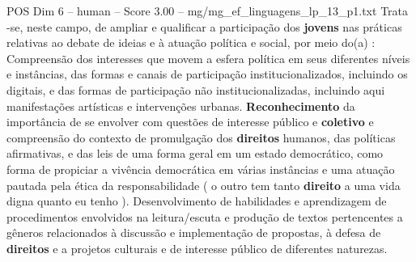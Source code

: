 \begin{textsample}{POS Dim 6 – human – Score 3.00 – mg/mg\_ef\_linguagens\_lp\_13\_p1.txt}  \label{ex:f6_pos_019}
Trata -se, neste campo, de ampliar e qualificar a participação dos \textbf{jovens} nas práticas relativas ao debate de ideias e à atuação política e social, por meio do(a) : Compreensão dos interesses que movem a esfera política em seus diferentes níveis e instâncias, das formas e canais de participação institucionalizados, incluindo os digitais, e das formas de participação não institucionalizadas, incluindo aqui manifestações artísticas e intervenções urbanas. \textbf{Reconhecimento} da importância de se envolver com questões de interesse público e \textbf{coletivo} e compreensão do contexto de promulgação dos \textbf{direitos} humanos, das políticas afirmativas, e das leis de uma forma geral em um estado democrático, como forma de propiciar a vivência democrática em várias instâncias e uma atuação pautada pela ética da responsabilidade ( o outro tem tanto \textbf{direito} a uma vida digna quanto eu tenho ).
Desenvolvimento de habilidades e aprendizagem de procedimentos envolvidos na leitura/escuta e produção de textos pertencentes a gêneros relacionados à discussão e implementação de propostas, à defesa de \textbf{direitos} e a projetos culturais e de interesse público de diferentes naturezas.

\end{textsample}
